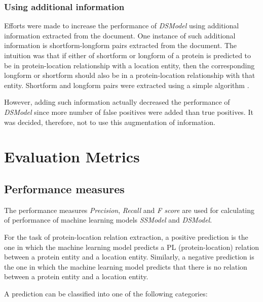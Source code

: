 \subsubsection*{Using additional information}

Efforts were made to increase the performance of \textit{DSModel} using additional information extracted from the document. One instance of such additional information is shortform-longform pairs extracted from the document. The intuition was that if either of shortform or longform of a protein is predicted to be in protein-location relationship with a location entity, then the corresponding longform or shortform should also be in a protein-location relationship with that entity. Shortform and longform pairs were extracted using a simple algorithm \cite{hearst2003simple}.

However, adding such information actually decreased the performance of \textit{DSModel} since more number of false positives were added than true positives. It was decided, therefore, not to use this augmentation of information.

\section{Evaluation Metrics} \label{sec:evaluationCriteria}

\subsection{Performance measures}
The performance measures \textit{Precision}, \textit{Recall} and \textit{F score} are used for calculating of performance of machine learning models \textit{SSModel} and \textit{DSModel}.

For the task of protein-location relation extraction, a positive prediction is the one in which the machine learning model predicts a PL (protein-location) relation between a protein entity and a location entity. Similarly, a negative prediction is the one in which the machine learning model predicts that there is no relation between a protein entity and a location entity.

A prediction can be classified into one of the following categories:



